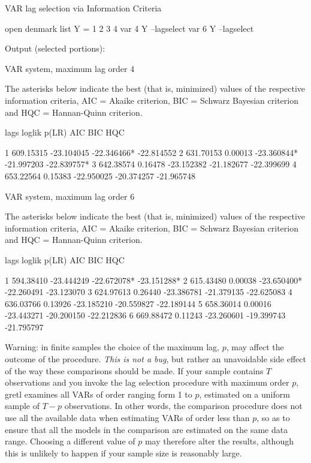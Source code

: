 \begin{script}[htbp]
  \caption{VAR lag selection via Information Criteria}
  \label{script:var-lagselect}
\begin{scode}
open denmark
list Y = 1 2 3 4
var 4 Y --lagselect
var 6 Y --lagselect
\end{scode}
Output (selected portions):
\begin{outbit}
VAR system, maximum lag order 4

The asterisks below indicate the best (that is, minimized) values
of the respective information criteria, AIC = Akaike criterion,
BIC = Schwarz Bayesian criterion and HQC = Hannan-Quinn criterion.

lags        loglik    p(LR)       AIC          BIC          HQC

   1     609.15315           -23.104045   -22.346466*  -22.814552 
   2     631.70153  0.00013  -23.360844*  -21.997203   -22.839757*
   3     642.38574  0.16478  -23.152382   -21.182677   -22.399699 
   4     653.22564  0.15383  -22.950025   -20.374257   -21.965748 

VAR system, maximum lag order 6

The asterisks below indicate the best (that is, minimized) values
of the respective information criteria, AIC = Akaike criterion,
BIC = Schwarz Bayesian criterion and HQC = Hannan-Quinn criterion.

lags        loglik    p(LR)       AIC          BIC          HQC

   1     594.38410           -23.444249   -22.672078*  -23.151288*
   2     615.43480  0.00038  -23.650400*  -22.260491   -23.123070 
   3     624.97613  0.26440  -23.386781   -21.379135   -22.625083 
   4     636.03766  0.13926  -23.185210   -20.559827   -22.189144 
   5     658.36014  0.00016  -23.443271   -20.200150   -22.212836 
   6     669.88472  0.11243  -23.260601   -19.399743   -21.795797 
\end{outbit}
\end{script}

Warning: in finite samples the choice of the maximum lag, $p$, may
affect the outcome of the procedure. \textit{This is not a bug}, but
rather an unavoidable side effect of the way these comparisons should
be made. If your sample contains $T$ observations and you invoke the
lag selection procedure with maximum order $p$, gretl examines
all VARs of order ranging form 1 to $p$, estimated on a uniform sample
of $T-p$ observations. In other words, the comparison procedure does
not use all the available data when estimating VARs of order less than
$p$, so as to ensure that all the models in the comparison are
estimated on the same data range. Choosing a different value of $p$
may therefore alter the results, although this is unlikely to happen
if your sample size is reasonably large.

